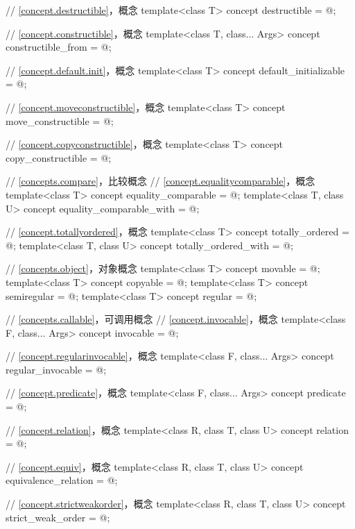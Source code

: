 \begin{codeblock}
{  // \ref{concept.destructible}，概念 
  template<class T>
    concept destructible = @\seebelow@;

  // \ref{concept.constructible}，概念 
  template<class T, class... Args>
    concept constructible_from = @\seebelow@;

  // \ref{concept.default.init}，概念 
  template<class T>
    concept default_initializable = @\seebelow@;

  // \ref{concept.moveconstructible}，概念 
  template<class T>
    concept move_constructible = @\seebelow@;

  // \ref{concept.copyconstructible}，概念 
  template<class T>
    concept copy_constructible = @\seebelow@;

  // \ref{concepts.compare}，比较概念
  // \ref{concept.equalitycomparable}，概念 
  template<class T>
    concept equality_comparable = @\seebelow@;
  template<class T, class U>
    concept equality_comparable_with = @\seebelow@;

  // \ref{concept.totallyordered}，概念 
  template<class T>
    concept totally_ordered = @\seebelow@;
  template<class T, class U>
    concept totally_ordered_with = @\seebelow@;

  // \ref{concepts.object}，对象概念
  template<class T>
    concept movable = @\seebelow@;
  template<class T>
    concept copyable = @\seebelow@;
  template<class T>
    concept semiregular = @\seebelow@;
  template<class T>
    concept regular = @\seebelow@;

  // \ref{concepts.callable}，可调用概念
  // \ref{concept.invocable}，概念 
  template<class F, class... Args>
    concept invocable = @\seebelow@;

  // \ref{concept.regularinvocable}，概念 
  template<class F, class... Args>
    concept regular_invocable = @\seebelow@;

  // \ref{concept.predicate}，概念 
  template<class F, class... Args>
    concept predicate = @\seebelow@;

  // \ref{concept.relation}，概念 
  template<class R, class T, class U>
    concept relation = @\seebelow@;

  // \ref{concept.equiv}，概念 
  template<class R, class T, class U>
    concept equivalence_relation = @\seebelow@;

  // \ref{concept.strictweakorder}，概念 
  template<class R, class T, class U>
    concept strict_weak_order = @\seebelow@;
}
\end{codeblock}

